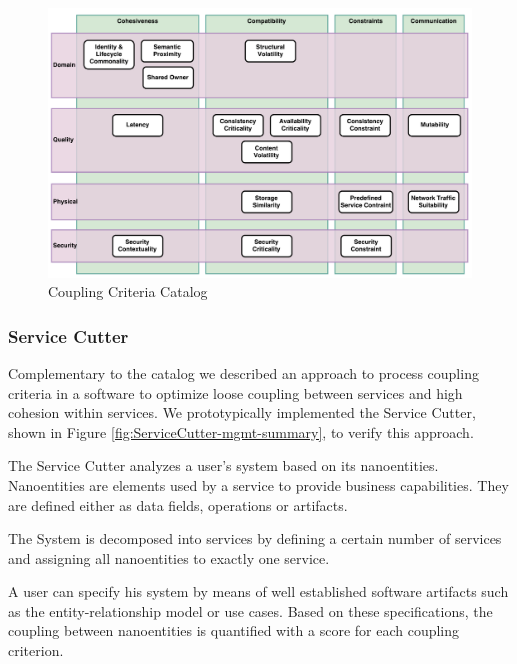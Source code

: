 \begin{figure}[H]
	\centerline{\includegraphics[scale=0.5]{diagrams/CouplingCatalog.pdf}}
	\caption{Coupling Criteria Catalog}
	\label{fig:cc-catalog-mgmt-summary}
\end{figure}


\subsubsection{Service Cutter}

Complementary to the catalog we described an approach to process coupling criteria in a software to optimize loose coupling between services and high cohesion within services. We prototypically implemented the Service Cutter, shown in Figure \ref{fig:ServiceCutter-mgmt-summary}, to verify this approach.

The Service Cutter analyzes a user's \gls{system} based on its nanoentities. Nanoentities are elements used by a service to provide business capabilities. They are defined either as data fields, operations or artifacts. 

The System is decomposed into services by defining a certain number of services and assigning all nanoentities to exactly one service.

A user can specify his system by means of well established software artifacts such as the entity-relationship model or use cases. Based on these specifications, the coupling between nanoentities is quantified with a score for each coupling criterion. 

